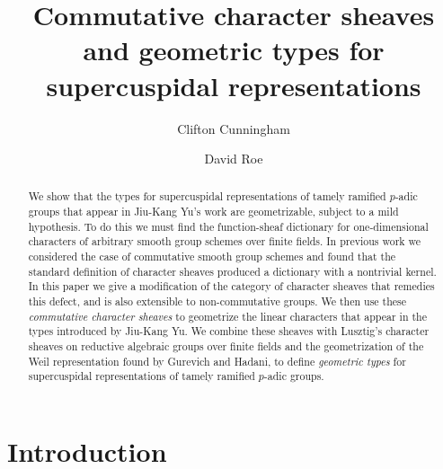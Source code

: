 \documentclass[10pt]{amsart}
\title[Commutative character sheaves and geometric types]{Commutative character sheaves and geometric types for supercuspidal representations}
\author{Clifton Cunningham}
\author{David Roe}
\theoremstyle{plain}
\theoremstyle{definition}
\begin{document}
\begin{abstract}
We show that the types for supercuspidal representations of tamely ramified $p$-adic groups that appear in Jiu-Kang Yu's work are geometrizable, subject to a mild hypothesis.
To do this we must find the function-sheaf dictionary for one-dimen\-sion\-al characters of arbitrary smooth group schemes over finite fields.  
In previous work we considered the case of commutative smooth group schemes and found that the standard definition of character sheaves produced a dictionary with a nontrivial kernel.  
In this paper we give a modification of the category of character sheaves that remedies this defect, and is also extensible to non-commutative groups.  
We then use these \emph{commutative character sheaves} to geometrize the linear characters that appear in the types introduced by Jiu-Kang Yu.
We combine these sheaves with Lusztig's character sheaves on reductive algebraic groups over finite fields and the geometrization of the Weil representation found by Gurevich and Hadani, to define \emph{geometric types} for supercuspidal representations of tamely ramified $p$-adic groups.
\end{abstract}

\maketitle

\tableofcontents

\section*{Introduction}
\end{document}

